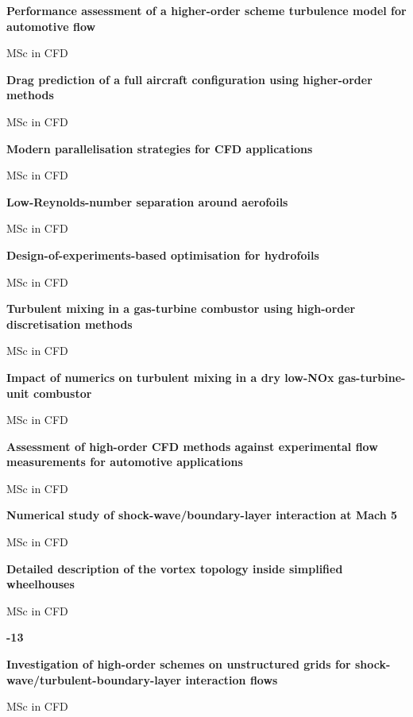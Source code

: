 \documentclass[11pt,a4paper]{article}
\newlength{\cventrysep}
\newenvironment{cventry}{%
  \par\noindent\begin{minipage}{\linewidth}
  \RaggedRight\fontsize{9.8}{12.5}\selectfont
}{\end{minipage}\par\addvspace{\cventrysep}}
\newcommand{\cvtitle}[1]{{\bfseries #1\par}\vspace{1pt}}
\newcommand{\cvmeta}[1]{{\fontsize{9}{11.5}\selectfont\color{Muted}#1\par}\vspace{1pt}}
\newcommand{\cvyear}[1]{{\color{Teal}\bfseries\fontsize{11}{13}\selectfont #1\par}\vspace{6pt}}
\begin{document}
\begin{cventry}
\cvtitle{Performance assessment of a higher-order scheme turbulence model for automotive flow}
\cvmeta{MSc in CFD}
\end{cventry}

\begin{cventry}
\cvtitle{Drag prediction of a full aircraft configuration using higher-order methods}
\cvmeta{MSc in CFD}
\end{cventry}

\begin{cventry}
\cvtitle{Modern parallelisation strategies for CFD applications}
\cvmeta{MSc in CFD}
\end{cventry}

\begin{cventry}
\cvtitle{Low-Reynolds-number separation around aerofoils}
\cvmeta{MSc in CFD}
\end{cventry}

\begin{cventry}
\cvtitle{Design-of-experiments-based optimisation for hydrofoils}
\cvmeta{MSc in CFD}
\end{cventry}

\begin{cventry}
\cvtitle{Turbulent mixing in a gas-turbine combustor using high-order discretisation methods}
\cvmeta{MSc in CFD}
\end{cventry}

\begin{cventry}
\cvtitle{Impact of numerics on turbulent mixing in a dry low-NOx gas-turbine-unit combustor}
\cvmeta{MSc in CFD}
\end{cventry}

\begin{cventry}
\cvtitle{Assessment of high-order CFD methods against experimental flow measurements for automotive applications}
\cvmeta{MSc in CFD}
\end{cventry}

\begin{cventry}
\cvtitle{Numerical study of shock-wave/boundary-layer interaction at Mach 5}
\cvmeta{MSc in CFD}
\end{cventry}

\begin{cventry}
\cvtitle{Detailed description of the vortex topology inside simplified wheelhouses}
\cvmeta{MSc in CFD}
\end{cventry}

\begin{cventry}
\cvyear{2012-13}
\cvtitle{Investigation of high-order schemes on unstructured grids for shock-wave/turbulent-boundary-layer interaction flows}
\cvmeta{MSc in CFD}
\end{cventry}
\end{document}
